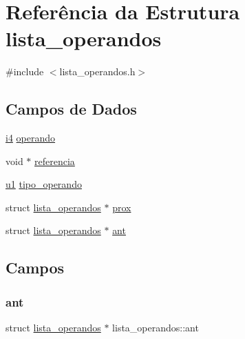 \hypertarget{structlista__operandos}{}\section{Referência da Estrutura lista\+\_\+operandos}
\label{structlista__operandos}


{\ttfamily \#include $<$lista\+\_\+operandos.\+h$>$}

\subsection*{Campos de Dados}
\begin{DoxyCompactItemize}
\item 
\hyperlink{lista__operandos_8h_a7bc084923d20fddbe46335d882c6fda2}{i4} \hyperlink{structlista__operandos_ab978dbacb8f42fd87f19cca8e804d121}{operando}
\item 
void $\ast$ \hyperlink{structlista__operandos_a5efba56f9f00715a8c9558292b851d37}{referencia}
\item 
\hyperlink{lista__operandos_8h_ad9f4cdb6757615aae2fad89dab3c5470}{u1} \hyperlink{structlista__operandos_af64bc84846f21a809f68b783f0e39f40}{tipo\+\_\+operando}
\item 
struct \hyperlink{structlista__operandos}{lista\+\_\+operandos} $\ast$ \hyperlink{structlista__operandos_a90699e5c7f710177b37754cd5231c9f5}{prox}
\item 
struct \hyperlink{structlista__operandos}{lista\+\_\+operandos} $\ast$ \hyperlink{structlista__operandos_abe9d6cbd0d571fc22564a95b17a98123}{ant}
\end{DoxyCompactItemize}


\subsection{Campos}
\mbox{\label{structlista__operandos_abe9d6cbd0d571fc22564a95b17a98123}} 
\subsubsection{\texorpdfstring{ant}{ant}}
{\footnotesize\ttfamily struct \hyperlink{structlista__operandos}{lista\+\_\+operandos} $\ast$ lista\+\_\+operandos\+::ant}

\mbox{\label{structlista__operandos_ab978dbacb8f42fd87f19cca8e804d121}} 
